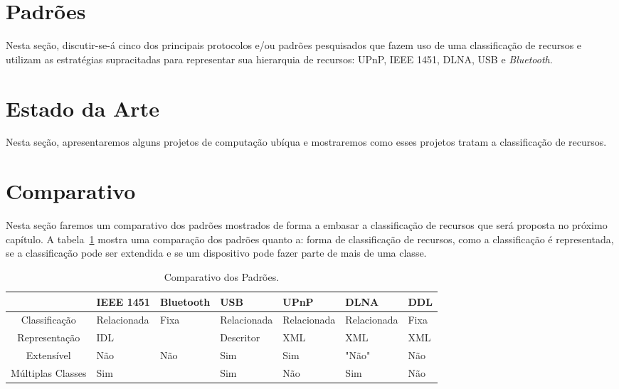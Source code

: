 \section{Padrões}

Nesta seção, discutir-se-á cinco dos principais protocolos e/ou padrões pesquisados que fazem uso de uma classificação de recursos e utilizam as estratégias supracitadas para representar sua hierarquia de recursos: UPnP, IEEE 1451, DLNA, USB e \emph{Bluetooth}.








\section{Estado da Arte}
Nesta seção, apresentaremos alguns projetos de computação ubíqua e mostraremos como esses projetos tratam a classificação de recursos.





\section{Comparativo}
Nesta seção faremos um comparativo dos padrões mostrados de forma a embasar a classificação de recursos que será proposta no próximo capítulo. A tabela~\ref{tab:comparativo} mostra uma comparação dos padrões quanto a: forma de classificação de recursos, como a classificação é representada, se a classificação pode ser extendida e se um dispositivo pode fazer parte de mais de uma classe.

\begin{table}
	\begin{center}
		\begin{tabular}{cllllll}
		\hline
							& \textbf{IEEE 1451}	& \textbf{Bluetooth} 	& \textbf{USB}	& \textbf{UPnP} & \textbf{DLNA} & \textbf{DDL}\\
		\hline
		\hline
		Classificação 		& Relacionada 			& Fixa 					& Relacionada 	& Relacionada 	& Relacionada 	& Fixa \\
		\hline
		Representação 		& IDL 					&						& Descritor		& XML			& XML & XML \\ 
		\hline
		Extensível 			& Não 					& Não 					& Sim 			& Sim 			& "Não" & Não \\
		\hline
		Múltiplas Classes 	& Sim 					&						& Sim 			& Não 			& Sim & Não \\
		\hline
		\end{tabular}
	\end{center}
	\caption{Comparativo dos Padrões.}
	\label{tab:comparativo}
\end{table}
 
